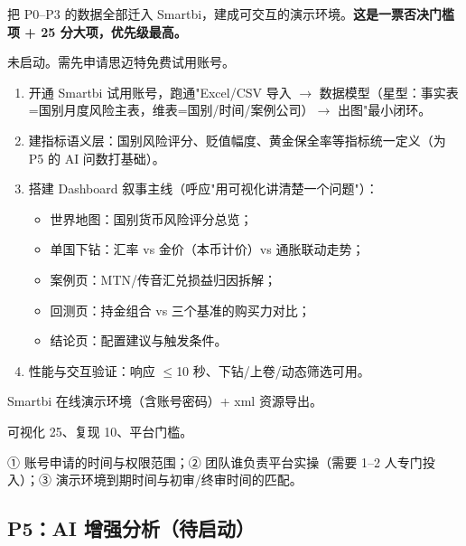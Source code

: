 \documentclass[UTF8,12pt]{ctexart}
\begin{document}
\begin{description}[style=nextline]
\item[目标] 把 P0--P3 的数据全部迁入 Smartbi，建成可交互的演示环境。\textbf{这是一票否决门槛项 + 25 分大项，优先级最高。}
\item[现状] 未启动。需先申请思迈特免费试用账号。
\item[具体动作]
\begin{enumerate}
\item 开通 Smartbi 试用账号，跑通"Excel/CSV 导入 $\to$ 数据模型（星型：事实表=国别月度风险主表，维表=国别/时间/案例公司）$\to$ 出图"最小闭环。
\item 建指标语义层：国别风险评分、贬值幅度、黄金保全率等指标统一定义（为 P5 的 AI 问数打基础）。
\item 搭建 Dashboard 叙事主线（呼应"用可视化讲清楚一个问题"）：
\begin{itemize}
\item 世界地图：国别货币风险评分总览；
\item 单国下钻：汇率 vs 金价（本币计价）vs 通胀联动走势；
\item 案例页：MTN/传音汇兑损益归因拆解；
\item 回测页：持金组合 vs 三个基准的购买力对比；
\item 结论页：配置建议与触发条件。
\end{itemize}
\item 性能与交互验证：响应 $\le$10 秒、下钻/上卷/动态筛选可用。
\end{enumerate}
\item[产出物] Smartbi 在线演示环境（含账号密码）+ xml 资源导出。
\item[对应评分项] 可视化 25、复现 10、平台门槛。
\item[风险与待决问题] ① 账号申请的时间与权限范围；② 团队谁负责平台实操（需要 1--2 人专门投入）；③ 演示环境到期时间与初审/终审时间的匹配。
\end{description}

\subsection{P5：AI 增强分析（待启动）}
\end{document}
